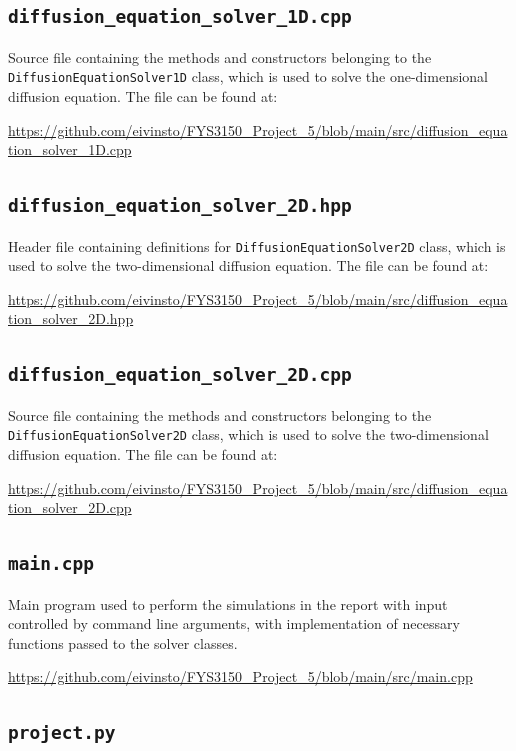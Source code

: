 \documentclass[reprint,english,notitlepage]{revtex4-1}  %
\begin{document}
\cprotect\subsection{\verb+diffusion_equation_solver_1D.cpp+} \label{A.2}

Source file containing the methods and constructors belonging to the \verb+DiffusionEquationSolver1D+ class, which is used to solve the one-dimensional diffusion equation. The file can be found at:

\url{https://github.com/eivinsto/FYS3150_Project_5/blob/main/src/diffusion_equation_solver_1D.cpp}

\cprotect\subsection{\verb+diffusion_equation_solver_2D.hpp+} \label{A.3}

Header file containing definitions for \verb+DiffusionEquationSolver2D+ class, which is used to solve the two-dimensional diffusion equation. The file can be found at:

\url{https://github.com/eivinsto/FYS3150_Project_5/blob/main/src/diffusion_equation_solver_2D.hpp}


\cprotect\subsection{\verb+diffusion_equation_solver_2D.cpp+} \label{A.4}

Source file containing the methods and constructors belonging to the \verb+DiffusionEquationSolver2D+ class, which is used to solve the two-dimensional diffusion equation. The file can be found at:

\url{https://github.com/eivinsto/FYS3150_Project_5/blob/main/src/diffusion_equation_solver_2D.cpp}


\cprotect\subsection{\verb+main.cpp+} \label{A.5}

Main program used to perform the simulations in the report with input controlled by command line arguments, with implementation of necessary functions passed to the solver classes.

\url{https://github.com/eivinsto/FYS3150_Project_5/blob/main/src/main.cpp}


\cprotect\subsection{\verb+project.py+} \label{A.6} 
\end{document}
